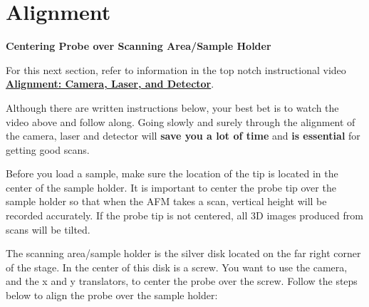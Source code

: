 \documentclass{../lab}
\begin{document}
\section{Alignment}
\label{sec:Alignment}

\textbf{Centering Probe over Scanning Area/Sample Holder}

For this next section, refer to information in the top notch instructional video  \href{http://experimentationlab.berkeley.edu/sites/default/files/alignment\_final2.mp4}{\textbf{Alignment: Camera, Laser, and Detector}}.

Although there are written instructions below, your best bet is to watch the video above and follow along. Going slowly and surely through the alignment of the camera, laser and detector will \textbf{save you a lot of time} and \textbf{is essential} for getting good scans.

Before you load a sample, make sure the location of the tip is located in the center of the sample holder.  It is important to center the probe tip over the sample holder so that when the AFM takes a scan, vertical height will be recorded accurately.  If the probe tip is not centered, all 3D images produced from scans will be tilted.

The scanning area/sample holder is the silver disk located on the far right corner of the stage.  In the center of this disk is a screw.  You want to use the camera, and the x and y translators, to center the probe over the screw.  Follow the steps below to align the probe over the sample holder:
\end{document}
